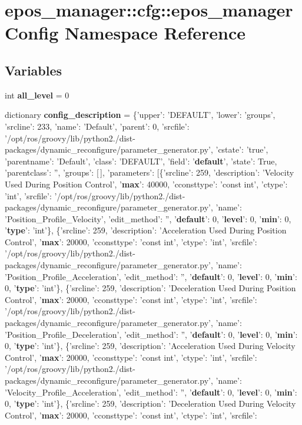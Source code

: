 \section{epos\-\_\-manager\-:\-:cfg\-:\-:epos\-\_\-manager\-Config \-Namespace \-Reference}
\label{namespaceepos__manager_1_1cfg_1_1epos__managerConfig}
\subsection*{\-Variables}
\begin{DoxyCompactItemize}
\item 
int {\bf all\-\_\-level} = 0
\item 
dictionary {\bf config\-\_\-description} = \{'upper'\-: '\-D\-E\-F\-A\-U\-L\-T', 'lower'\-: 'groups', 'srcline'\-: 233, 'name'\-: '\-Default', 'parent'\-: 0, 'srcfile'\-: '/opt/ros/groovy/lib/python2./dist-\/packages/dynamic\-\_\-reconfigure/parameter\-\_\-generator.\-py', 'cstate'\-: 'true', 'parentname'\-: '\-Default', 'class'\-: '\-D\-E\-F\-A\-U\-L\-T', 'field'\-: '{\bf default}', 'state'\-: \-True, 'parentclass'\-: '', 'groups'\-: [$\,$], 'parameters'\-: [\{'srcline'\-: 259, 'description'\-: '\-Velocity \-Used \-During \-Position \-Control', '{\bf max}'\-: 40000, 'cconsttype'\-: 'const int', 'ctype'\-: 'int', 'srcfile'\-: '/opt/ros/groovy/lib/python2./dist-\/packages/dynamic\-\_\-reconfigure/parameter\-\_\-generator.\-py', 'name'\-: '\-Position\-\_\-\-Profile\-\_\-\-Velocity', 'edit\-\_\-method'\-: '', '{\bf default}'\-: 0, '{\bf level}'\-: 0, '{\bf min}'\-: 0, '{\bf type}'\-: 'int'\}, \{'srcline'\-: 259, 'description'\-: '\-Acceleration \-Used \-During \-Position \-Control', '{\bf max}'\-: 20000, 'cconsttype'\-: 'const int', 'ctype'\-: 'int', 'srcfile'\-: '/opt/ros/groovy/lib/python2./dist-\/packages/dynamic\-\_\-reconfigure/parameter\-\_\-generator.\-py', 'name'\-: '\-Position\-\_\-\-Profile\-\_\-\-Acceleration', 'edit\-\_\-method'\-: '', '{\bf default}'\-: 0, '{\bf level}'\-: 0, '{\bf min}'\-: 0, '{\bf type}'\-: 'int'\}, \{'srcline'\-: 259, 'description'\-: '\-Deceleration \-Used \-During \-Position \-Control', '{\bf max}'\-: 20000, 'cconsttype'\-: 'const int', 'ctype'\-: 'int', 'srcfile'\-: '/opt/ros/groovy/lib/python2./dist-\/packages/dynamic\-\_\-reconfigure/parameter\-\_\-generator.\-py', 'name'\-: '\-Position\-\_\-\-Profile\-\_\-\-Deceleration', 'edit\-\_\-method'\-: '', '{\bf default}'\-: 0, '{\bf level}'\-: 0, '{\bf min}'\-: 0, '{\bf type}'\-: 'int'\}, \{'srcline'\-: 259, 'description'\-: '\-Acceleration \-Used \-During \-Velocity \-Control', '{\bf max}'\-: 20000, 'cconsttype'\-: 'const int', 'ctype'\-: 'int', 'srcfile'\-: '/opt/ros/groovy/lib/python2./dist-\/packages/dynamic\-\_\-reconfigure/parameter\-\_\-generator.\-py', 'name'\-: '\-Velocity\-\_\-\-Profile\-\_\-\-Acceleration', 'edit\-\_\-method'\-: '', '{\bf default}'\-: 0, '{\bf level}'\-: 0, '{\bf min}'\-: 0, '{\bf type}'\-: 'int'\}, \{'srcline'\-: 259, 'description'\-: '\-Deceleration \-Used \-During \-Velocity \-Control', '{\bf max}'\-: 20000, 'cconsttype'\-: 'const int', 'ctype'\-: 'int', 'srcfile'\-: 
\end{DoxyCompactItemize}
